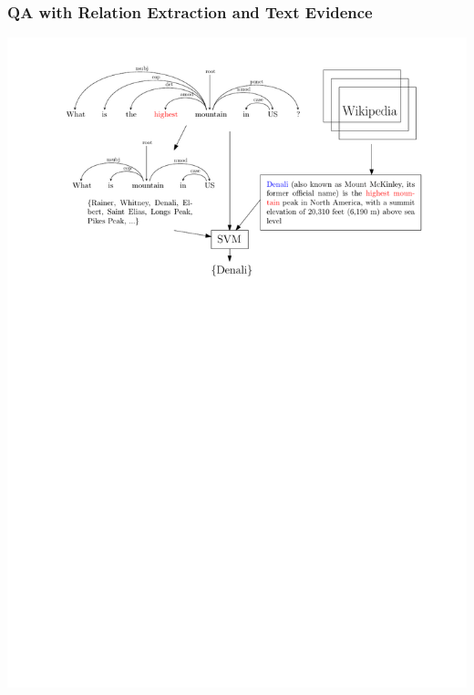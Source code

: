 \documentclass[mathserif,12pt]{beamer}
\begin{document}
\begin{frame}
\frametitle{QA with Relation Extraction and Text Evidence}
\centering
\includegraphics[scale=0.7]{figures/natural-logic-argmax-flowchart}
\end{frame} 
\end{document}
